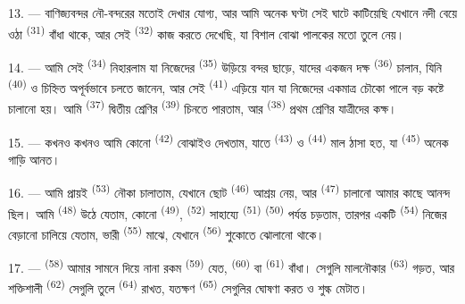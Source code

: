 13. --- বাণিজ্যবন্দর নৌ-বন্দরের মতোই দেখার যোগ্য, আর আমি অনেক ঘণ্টা সেই ঘাটে
কাটিয়েছি যেখানে নদী বেয়ে ওঠা 
\textsuperscript{(31)} বাঁধা থাকে, আর সেই 
\textsuperscript{(32)} কাজ করতে দেখেছি, যা বিশাল বোঝা পালকের মতো তুলে নেয়।

\VUsaut{4.0mm}
\VUsaut{3.0mm}

14. --- আমি সেই  \textsuperscript{(34)}
নিহারলাম যা নিজেদের  \textsuperscript{(35)} উড়িয়ে বন্দর ছাড়ে,
যাদের একজন দক্ষ  \textsuperscript{(36)} চালান, যিনি
 \textsuperscript{(40)} ও  চিহ্নিত
 অপূর্বভাবে চলতে জানেন, আর সেই 
\textsuperscript{(41)} এড়িয়ে যান যা নিজেদের একমাত্র চৌকো পালে বড় কষ্টে চালানো
হয়। আমি  \textsuperscript{(37)} দ্বিতীয় শ্রেণির
 \textsuperscript{(39)} চিনতে পারতাম, আর 
\textsuperscript{(38)} প্রথম শ্রেণির যাত্রীদের কক্ষ।

15. --- কখনও কখনও আমি কোনো  \textsuperscript{(42)}
বোঝাইও দেখতাম, যাতে  \textsuperscript{(43)} ও 
\textsuperscript{(44)} মাল ঠাসা হত, যা 
\textsuperscript{(45)} অনেক গাড়ি আনত।

\VUsaut{3.0mm}
\VUsaut{3.0mm}

16. --- আমি প্রায়ই  \textsuperscript{(53)} নৌকা চালাতাম,
যেখানে ছোট  \textsuperscript{(46)} আশ্রয় নেয়, আর
 \textsuperscript{(47)} চালানো আমার কাছে আনন্দ ছিল। আমি
 \textsuperscript{(48)} উঠে যেতাম, কোনো 
\textsuperscript{(49)},  \textsuperscript{(52)} সাহায্যে
 \textsuperscript{(51)} 
\textsuperscript{(50)} পর্যন্ত চড়তাম, তারপর একটি 
\textsuperscript{(54)} নিজের বেড়ানো চালিয়ে যেতাম, ভারী 
\textsuperscript{(55)} মাঝে, যেখানে  \textsuperscript{(56)} শুকোতে
ঝোলানো থাকে।

17. ---  \textsuperscript{(58)} আমার সামনে দিয়ে নানা রকম
 \textsuperscript{(59)} যেত,  \textsuperscript{(60)} বা
 \textsuperscript{(61)} বাঁধা। সেগুলি মালনৌকার 
\textsuperscript{(63)} গড়ত, আর শক্তিশালী  \textsuperscript{(62)}
সেগুলি তুলে  \textsuperscript{(64)} রাখত, যতক্ষণ
  \textsuperscript{(65)} সেগুলির ঘোষণা করত ও
শুল্ক মেটাত।

